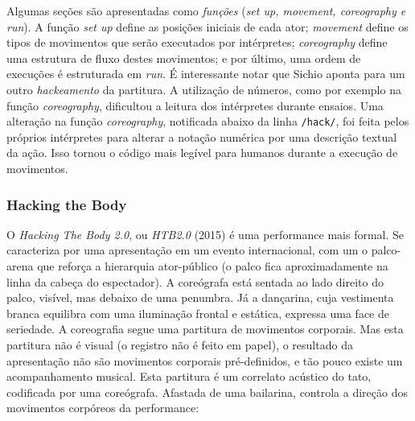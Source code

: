 Algumas seções são apresentadas como \emph{funções} (\emph{set up, movement, coreography \emph{e} run}). A função \emph{set up} define as posições iniciais de cada ator; \emph{movement} define os tipos de movimentos que serão executados por intérpretes; \emph{coreography} define uma estrutura de fluxo destes movimentos; e por último, uma ordem de execuções é estruturada em \emph{run}. É interessante notar que Sichio aponta para um outro \emph{hackeamento} da partitura. A utilização de números, como por exemplo na função \emph{coreography}, dificultou a leitura dos intérpretes durante ensaios. Uma alteração na função \emph{coreography}, notificada abaixo da linha \verb|/hack/|, foi feita pelos próprios intérpretes para alterar a notação numérica por uma descrição textual da ação. Isso tornou o código mais legível para humanos durante a execução de movimentos. 

\subsubsection{Hacking the Body}

O \emph{Hacking The Body 2.0}, ou \emph{HTB2.0} (2015) é uma performance mais formal. Se caracteriza por uma apresentação em um evento internacional, com um o palco-arena que reforça a hierarquia ator-público (o palco fica aproximadamente na linha da cabeça do espectador). A coreógrafa está sentada ao lado direito do palco, visível, mas debaixo de uma penumbra. Já a dançarina, cuja vestimenta branca equilibra com uma iluminação frontal e estática, expressa uma face de seriedade. A coreografia segue uma partitura de movimentos corporais.  Mas esta partitura não é visual (o registro não é feito em papel), o resultado da apresentação não são movimentos corporais pré-definidos, e tão pouco existe um acompanhamento musical. Esta partitura é um correlato acústico do tato, codificada por uma coreógrafa. Afastada de uma bailarina, controla a direção dos movimentos corpóreos da performance:

